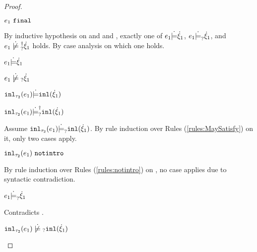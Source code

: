 \begin{proof}
\begin{byCases}
\begin{byCases}
\begin{pfsteps*}
        \item $e_1 ~\mathtt{final}$  
        \end{pfsteps*}
        By inductive hypothesis on  and  and , exactly one of $e_1 \dot{\models} \dot{\xi}_1$, $e_1 \dot{\models}_{?} \dot{\xi}_1$, and $\cnotsatisfyormay{e_1}{\hxi_1}$ holds. By case analysis on which one holds.
        \begin{byCases}
        \item[\csatisfy{e_1}{\hxi_1}]
            \begin{pfsteps*}
            \item $e_1 \dot{\models} \dot{\xi}_1$  
            \item $\cnotmaysatisfy{e_1}{\hxi_1}$  
            \item $\mathtt{inl}_{\tau_2}({e_1}) \dot{\models} \mathtt{inl}(\dot{\xi}_1)$  
            \item $\mathtt{inl}_{\tau_2}({e_1}) \dot{\models}_{?}^{\dag} \mathtt{inl}(\dot{\xi}_1)$ 
            \end{pfsteps*}
            Assume $\mathtt{inl}_{\tau_2}({e_1}) \dot{\models}_{?} \mathtt{inl}(\dot{\xi}_1)$. By rule induction over Rules (\ref{rules:MaySatisfy}) on it, only two cases apply.
            \begin{byCases}
            \item[\text{(\ref{rule:CMSNotIntro})}]
                \begin{pfsteps*}
                \item $\mathtt{inl}_{\tau_2}({e_1}) ~\mathtt{notintro}$  
                \end{pfsteps*}
                By rule induction over Rules (\ref{rules:notintro}) on , no case applies due to syntactic contradiction.
            \item[\text{(\ref{rule:CMSInl})}]
                \begin{pfsteps*}
                \item $e_1 \dot{\models}_{?} \dot{\xi}_1$
                \end{pfsteps*}
                Contradicts .
            \end{byCases}
            \begin{pfsteps*}
            \item $\cnotmaysatisfy{\hinl{\tau_2}{e_1}}{\cinl{\hxi_1}}$ 
            \end{pfsteps*}
            

\end{byCases}
\end{byCases}
\end{byCases}
\end{proof}
